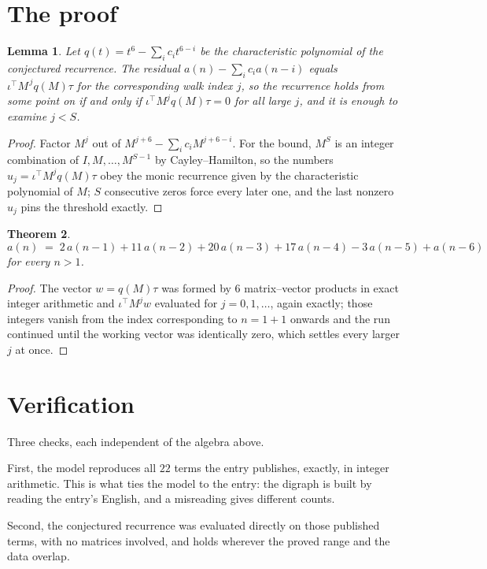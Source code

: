 \documentclass[11pt,a4paper]{article}
\theoremstyle{plain}
\newtheorem{theorem}{Theorem}
\newtheorem{lemma}[theorem]{Lemma}
\theoremstyle{definition}
\begin{document}
\section{The proof}

\begin{lemma}\label{lem:crit}
Let $q(t)=t^{6}-\sum_i c_it^{6-i}$ be the characteristic polynomial of the
conjectured recurrence. The residual $a(n)-\sum_ic_ia(n-i)$ equals
$\iota^{\!\top}M^{\,j}q(M)\tau$ for the corresponding walk index $j$, so the recurrence
holds from some point on if and only if $\iota^{\!\top}M^{j}q(M)\tau=0$ for all large $j$,
and it is enough to examine $j<S$.
\end{lemma}

\begin{proof}
Factor $M^{j}$ out of $M^{j+6}-\sum_ic_iM^{j+6-i}$. For the bound, $M^{S}$
is an integer combination of $I,M,\dots,M^{S-1}$ by Cayley--Hamilton, so the numbers
$u_j=\iota^{\!\top}M^{j}q(M)\tau$ obey the monic recurrence given by the characteristic
polynomial of $M$; $S$ consecutive zeros force every later one, and the last nonzero $u_j$
pins the threshold exactly.
\end{proof}

\begin{theorem}
\[
a(n)\;=\;2\,a(n-1) + 11\,a(n-2) + 20\,a(n-3) + 17\,a(n-4) - 3\,a(n-5) + a(n-6)
\]
for every $n>1$.
\end{theorem}

\begin{proof}
The vector $w=q(M)\tau$ was formed by $6$ matrix--vector products in exact integer
arithmetic and $\iota^{\!\top}M^{j}w$ evaluated for $j=0,1,\dots$, again exactly; those
integers vanish from the index corresponding to $n=1+1$ onwards and the run continued
until the working vector was identically zero, which settles every larger $j$ at once.
\end{proof}

\section{Verification}

Three checks, each independent of the algebra above.

First, the model reproduces all $22$ terms the entry publishes, exactly, in integer
arithmetic. This is what ties the model to the entry: the digraph is built by reading the
entry's English, and a misreading gives different counts.

Second, the conjectured recurrence was evaluated directly on those published terms, with no
matrices involved, and holds wherever the proved range and the data overlap.
\end{document}
